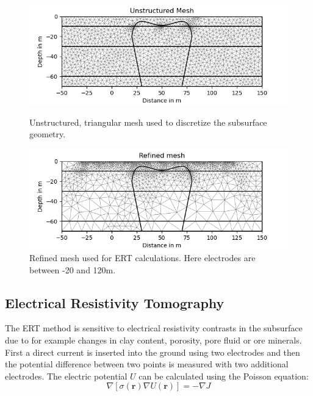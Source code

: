 \begin{figure}[]
  \centering
  \begin{minipage}[b]{0.48\textwidth}
    \includegraphics[width=\textwidth]{Figures/Mesh.png}
    \caption[Unstructured mesh]{Unstructured, triangular mesh used to discretize the subsurface geometry.}
    \label{figure:mesh}
  \end{minipage}
  \hfill
  \begin{minipage}[b]{0.48\textwidth}
    \includegraphics[width=\textwidth]{Figures/ERT_refined_mesh.png}
    \caption[Refined mesh used for ERT calculations]{Refined mesh used for ERT calculations. Here electrodes are between -20 and 120m.}
    \label{figure:refined_mesh}
  \end{minipage}
\end{figure}

\subsection{Electrical Resistivity Tomography}\label{section:ERT}
The ERT method is sensitive to electrical resistivity contrasts in the subsurface due to for example changes in clay content, porosity, pore fluid or ore minerals. First a direct current is inserted into the ground using two electrodes and then the potential difference between two points is measured with two additional electrodes. The electric potential $U$ can be calculated using the Poisson equation: 
\begin{equation}
    \nabla[\sigma (\textbf{r}) \nabla U(\textbf{r})] = -\nabla J
    \label{Eq:poisson}
\end{equation}

